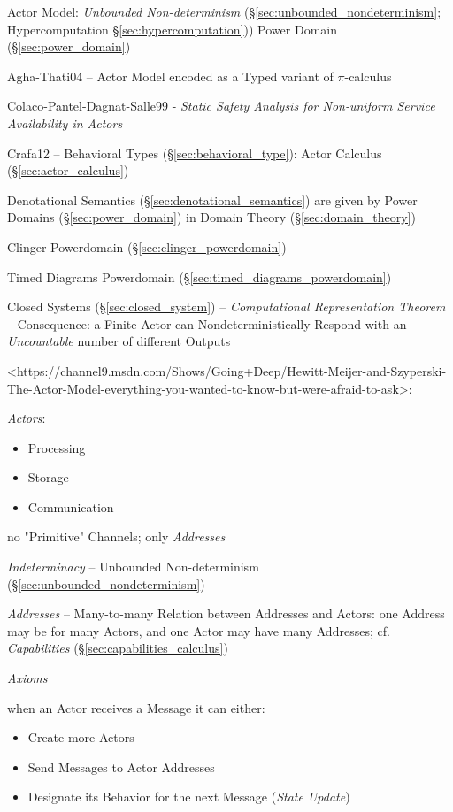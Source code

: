 Actor Model: \emph{Unbounded Non-determinism}
(\S\ref{sec:unbounded_nondeterminism}; \fist Hypercomputation
\S\ref{sec:hypercomputation})) Power Domain (\S\ref{sec:power_domain})

Agha-Thati04 -- Actor Model encoded as a Typed variant of
$\pi$-calculus

Colaco-Pantel-Dagnat-Salle99 - \emph{Static Safety Analysis for
  Non-uniform Service Availability in Actors}

Crafa12 -- Behavioral Types (\S\ref{sec:behavioral_type}): Actor
Calculus (\S\ref{sec:actor_calculus})

Denotational Semantics (\S\ref{sec:denotational_semantics}) are given
by Power Domains (\S\ref{sec:power_domain}) in Domain Theory
(\S\ref{sec:domain_theory})

Clinger Powerdomain (\S\ref{sec:clinger_powerdomain})

Timed Diagrams Powerdomain (\S\ref{sec:timed_diagrams_powerdomain})

Closed Systems (\S\ref{sec:closed_system}) -- \emph{Computational
  Representation Theorem} -- Consequence: a Finite Actor can
Nondeterministically Respond with an \emph{Uncountable} number of
different Outputs %

<https://channel9.msdn.com/Shows/Going+Deep/Hewitt-Meijer-and-Szyperski-The-Actor-Model-everything-you-wanted-to-know-but-were-afraid-to-ask>:

\emph{Actors}:

\begin{itemize}
\item Processing
\item Storage
\item Communication
\end{itemize}

no "Primitive" Channels; only \emph{Addresses}

\emph{Indeterminacy} -- Unbounded Non-determinism
(\S\ref{sec:unbounded_nondeterminism})

\emph{Addresses} -- Many-to-many Relation between Addresses and
Actors: one Address may be for many Actors, and one Actor may have
many Addresses; cf. \emph{Capabilities}
(\S\ref{sec:capabilities_calculus})

\emph{Axioms} %

when an Actor receives a Message it can either:
\begin{itemize}
\item Create more Actors
\item Send Messages to Actor Addresses
\item Designate its Behavior for the next Message (\emph{State Update})
\end{itemize}


